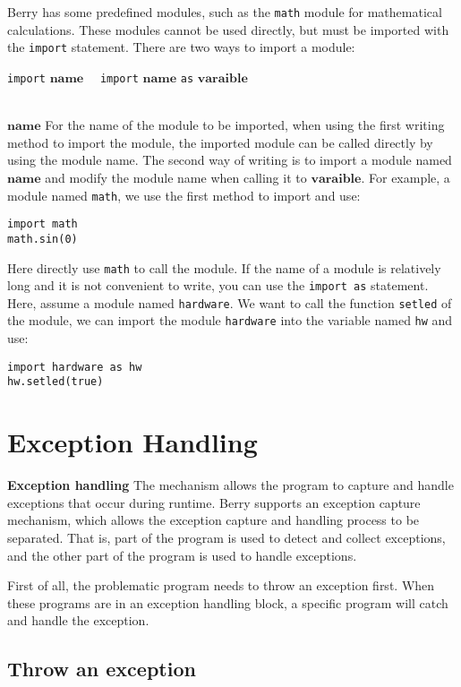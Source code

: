 Berry has some predefined modules, such as the \texttt{math} module for mathematical calculations. These modules cannot be used directly, but must be imported with the \texttt{import} statement. There are two ways to import a module:
\begin{algorithm}
    \texttt{import} $\bm{name}$ \ \
    \texttt{import} $\bm{name}$ \texttt{as} $\bm{varaible}$
\end{algorithm}\vspace{-0.6em}\\
$\bm{name}$ For the name of the module to be imported, when using the first writing method to import the module, the imported module can be called directly by using the module name. The second way of writing is to import a module named $\bm{name}$ and modify the module name when calling it to $\bm{varaible}$. For example, a module named \texttt{math}, we use the first method to import and use:
\begin{lstlisting}[language=berry, numbers=none]
import math
math.sin(0)
\end{lstlisting}
Here directly use \texttt{math} to call the module. If the name of a module is relatively long and it is not convenient to write, you can use the \texttt{import as} statement. Here, assume a module named \texttt{hardware}. We want to call the function \texttt{setled} of the module, we can import the module \texttt{hardware} into the variable named \texttt{hw} and use:
\begin{lstlisting}[language=berry, numbers=none]
import hardware as hw
hw.setled(true)
\end{lstlisting}

\section {Exception Handling}

\textbf{Exception handling} The mechanism allows the program to capture and handle exceptions that occur during runtime. Berry supports an exception capture mechanism, which allows the exception capture and handling process to be separated. That is, part of the program is used to detect and collect exceptions, and the other part of the program is used to handle exceptions.

First of all, the problematic program needs to throw an exception first. When these programs are in an exception handling block, a specific program will catch and handle the exception.

\subsection {Throw an exception}

